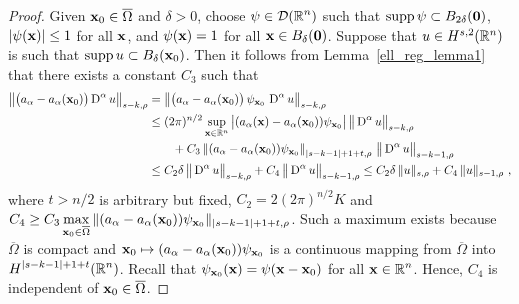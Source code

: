 \begin{proof}
Given $\mathbf{x}_0 \in \overline{\Omega}$ and $\delta >0$,
choose $\displaystyle \psi \in \mathcal{D}(\mathbb{R}^n)$ such that
$\operatorname{supp} \psi \subset B_{2\delta}(\mathbf{0})$, $|\psi(\mathbf{x})|\leq 1$ for
all $\mathbf{x}$, and $\psi(\mathbf{x}) = 1$ for all $\mathbf{x} \in B_\delta(\mathbf{0})$.
Suppose that $u \in H^{s,2}(\mathbb{R}^n)$ is such that
$\displaystyle \operatorname{supp} u \subset B_\delta(\mathbf{x}_0)$.
Then it follows
from Lemma~\ref{ell_reg_lemma1} that there exists a constant $C_3$ such that
\begin{align*}
\left\| \big(a_\alpha - a_\alpha(\mathbf{x}_0)\big)
\operatorname{D}^\alpha u \right\|_{s-k,\rho}
&= \left\| \big(a_\alpha - a_\alpha(\mathbf{x}_0)\big)\,\psi_{\mathbf{x}_0}\,
\operatorname{D}^\alpha u \right\|_{s-k,\rho} \\
&\leq (2\pi)^{n/2}
\sup_{\mathbf{x} \in \mathbb{R}^n} \big| (a_\alpha(\mathbf{x}) -
a_\alpha(\mathbf{x}_0)) \psi_{\mathbf{x}_0} \big|\,
\big\|\operatorname{D}^\alpha  u\big\|_{s-k,\rho} \\
&\qquad
+ C_3 \left\|(a_\alpha - a_\alpha(\mathbf{x}_0))
\psi_{\mathbf{x}_0}\right\|_{|s-k-1|+1+t,\rho}
\, \big\|\operatorname{D}^\alpha u \big\|_{s-k-1,\rho} \\
&\leq C_2 \delta \, \big\|\operatorname{D}^\alpha u\big\|_{s-k,\rho}
+ C_4 \, \big\|\operatorname{D}^\alpha u \big\|_{s-k-1,\rho} 
\leq C_2 \delta \, \|u\|_{s,\rho}
+ C_4 \, \|u \|_{s-1,\rho}  \ ,
\end{align*}
where $t > n/2$ is arbitrary but fixed,
$\displaystyle C_2 = 2 (2\pi)^{n/2}K$ and \\
$\displaystyle C_4 \geq C_3 \max_{\mathbf{x}_0 \in \overline{\Omega}}
\|(a_\alpha - a_\alpha(\mathbf{x}_0))\psi_{\mathbf{x}_0}\|_{|s-k-1|+1+t,\rho}$.
Such a maximum exists because $\overline{\Omega}$ is compact
and $\mathbf{x}_0 \mapsto (a_\alpha - a_\alpha(\mathbf{x}_0))\psi_{\mathbf{x}_0}$
is a continuous mapping from $\overline{\Omega}$ into
$\displaystyle H^{|s-k-1|+1+t}(\mathbb{R}^n)$.  Recall that
$\psi_{\mathbf{x}_0}(\mathbf{x}) = \psi(\mathbf{x} - \mathbf{x}_0)$ for all
$\displaystyle \mathbf{x} \in \mathbb{R}^n$.
Hence, $C_4$ is independent of $\mathbf{x}_0 \in \overline{\Omega}$.


\end{proof}
